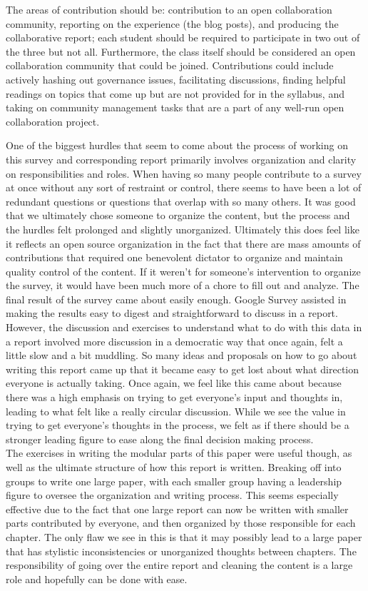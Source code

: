 \noindent The areas of contribution should be: contribution to an open collaboration community, reporting on the experience (the blog posts), and producing the collaborative report; each student should be required to participate in two out of the three but not all. Furthermore, the class itself should be considered an open collaboration community that could be joined. Contributions could include actively hashing out governance issues, facilitating discussions, finding helpful readings on topics that come up but are not provided for in the syllabus, and taking on community management tasks that are a part of any well-run open collaboration project. 

One of the biggest hurdles that seem to come about the process of working on this survey and corresponding report primarily involves organization and clarity on responsibilities and roles. When having so many people contribute to a survey at once without any sort of restraint or control, there seems to have been a lot of redundant questions or questions that overlap with so many others. It was good that we ultimately chose someone to organize the content, but the process and the hurdles felt prolonged and slightly unorganized. Ultimately this does feel like it reflects an open source organization in the fact that there are mass amounts of contributions that required one benevolent dictator to organize and maintain quality control of the content. If it weren't for someone's intervention to organize the survey, it would have been much more of a chore to fill out and analyze. 
The final result of the survey came about easily enough. Google Survey assisted in making the results easy to digest and straightforward to discuss in a report. However, the discussion and exercises to understand what to do with this data in a report involved more discussion in a democratic way that once again, felt a little slow and a bit muddling. So many ideas and proposals on how to go about writing this report came up that it became easy to get lost about what direction everyone is actually taking. Once again, we feel like this came about because there was a high emphasis on trying to get everyone's input and thoughts in, leading to what felt like a really circular discussion. While we see the value in trying to get everyone's thoughts in the process, we felt as if there should be a stronger leading figure to ease along the final decision making process. \\

\noindent The exercises in writing the modular parts of this paper were useful though, as well as the ultimate structure of how this report is written. Breaking off into groups to write one large paper, with each smaller group having a leadership figure to oversee the organization and writing process. This seems especially effective due to the fact that one large report can now be written with smaller parts contributed by everyone, and then organized by those responsible for each chapter. The only flaw we see in this is that it may possibly lead to a large paper that has stylistic inconsistencies or unorganized thoughts between chapters. The responsibility of going over the entire report and cleaning the content is a large role and hopefully can be done with ease.
